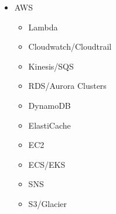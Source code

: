\documentclass{resume}
\begin{document}
\begin{minipage}[t]{0.3\textwidth}
  \begin{itemize}
    \item AWS
    \begin{itemize}
      \item Lambda
      \item Cloudwatch/Cloudtrail
      \item Kinesis/SQS
      \item RDS/Aurora Clusters
      \item DynamoDB
      \item ElastiCache
      \item EC2
      \item ECS/EKS
      \item SNS
      \item S3/Glacier
    \end{itemize}
  \end{itemize}
\end{minipage}
\end{document}
